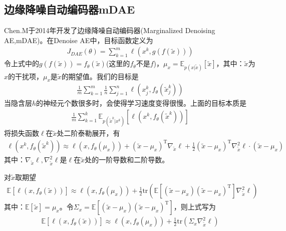     \subsection{边缘降噪自动编码器mDAE}
        \par
        Chen.M于2014年开发了边缘降噪自动编码器(Marginalized Denoising AE,mDAE)\cite{2014.Chen}。在Denoise AE中，目标函数定义为
        \begin{align*}
        J_{DAE}(\theta) = \sum_{k=1}^m \ell \left( x^k,g(f(\tilde{x})) \right)
        \end{align*}
        令上式中的$g(f(\tilde{x})) = f_\theta(\tilde{x})$(这里的$f_\theta$不是$f$)，$\mu_x = \mathbb{E}_{p(x|\tilde{x})}[\tilde{x}]$，其中：$\tilde{x}$为$x$的干扰项，$\mu_x$是$\tilde{x}$的期望值。我们的目标是
        \begin{align*}
        \frac{1}{m} \sum_{k=1}^m \frac{1}{n} \sum_{j=1}^n \ell \left( x_j^k,f_\theta \left( \tilde{x}_j^k \right)  \right)
        \end{align*}
        当隐含层$h$的神经元个数很多时，会使得学习速度变得很慢。上面的目标本质是
        \begin{align*}
        \frac{1}{m} \sum_{k=1}^k \mathbb{E}_{p(\tilde{x}^k|x^k)}[\ell (x^k,f_\theta(\tilde{x}^k))  ]
        \end{align*}
        将损失函数$\ell$在$\tilde{x}$处二阶泰勒展开，有
        \begin{align*}
        \ell \left( x^k,f_\theta(\tilde{x}^k) \right) \approx \ell (x,f_\theta(\mu_x))+(\tilde{x} - \mu_x)^\mathrm{T}\nabla_{\tilde{x}} \ell+ \frac{1}{2}(\tilde{x} - \mu_x)^\mathrm{T}\nabla_{\tilde{x}}^2 \ell \cdot (\tilde{x} - \mu_x)
        \end{align*}
        其中：$\nabla_{\tilde{x}}\ell,\nabla_{\tilde{x}}^2\ell$是$\ell$在$\tilde{x}$处的一阶导数和二阶导数。
        \par
        对$\tilde{x}$取期望
        \begin{align*}
        \mathbb{E} [\ell(x,f_\theta(\tilde{x}))] \approx \ell (x,f_\theta(\mu_x)) + \frac{1}{2} \mathrm{tr} \left( \mathbb{E}[(\tilde{x} - \mu_x)(\tilde{x} - \mu_x)^\mathrm{T} ]\nabla_{\tilde{x}}^2 \ell\right)
        \end{align*}
        其中：$\mathbb{E}[\tilde{x}] = \mu_x$。令$\Sigma_x = \mathbb{E}[(\tilde{x} - \mu_x)(\tilde{x} - \mu_x)^\mathrm{T} ]$，则上式写为
        \begin{align*}
        \mathbb{E} [\ell(x,f_\theta(\tilde{x}))] \approx \ell (x,f_\theta(\mu_x)) + \frac{1}{2} \mathrm{tr} \left(\Sigma_x \nabla_{\tilde{x}}^2 \ell \right)
        \end{align*}
